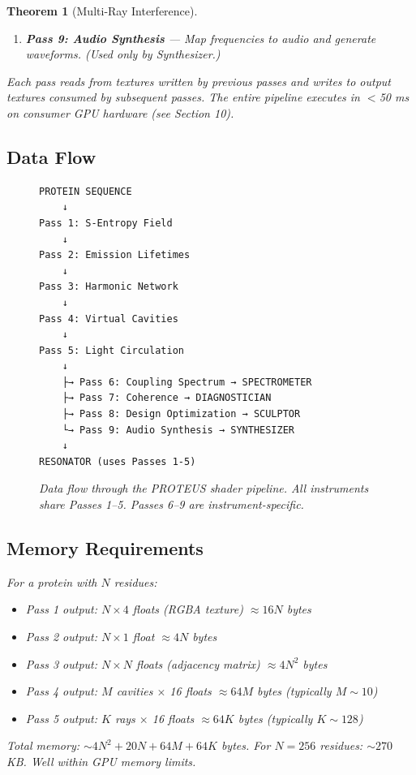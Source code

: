 \documentclass[11pt,a4paper]{article}
\newtheorem{theorem}{Theorem}[section]
\begin{document}
\begin{theorem}[Multi-Ray Interference]
\begin{enumerate}
\item \textbf{Pass 9: Audio Synthesis} — Map frequencies to audio and generate waveforms. (Used only by Synthesizer.)
\end{enumerate}

Each pass reads from textures written by previous passes and writes to output textures consumed by subsequent passes. The entire pipeline executes in $<$50 ms on consumer GPU hardware (see Section 10).

\subsection{Data Flow}

\begin{figure}[H]
\centering
\begin{verbatim}
PROTEIN SEQUENCE
    ↓
Pass 1: S-Entropy Field
    ↓
Pass 2: Emission Lifetimes
    ↓
Pass 3: Harmonic Network
    ↓
Pass 4: Virtual Cavities
    ↓
Pass 5: Light Circulation
    ↓
    ├→ Pass 6: Coupling Spectrum → SPECTROMETER
    ├→ Pass 7: Coherence → DIAGNOSTICIAN
    ├→ Pass 8: Design Optimization → SCULPTOR
    └→ Pass 9: Audio Synthesis → SYNTHESIZER
    ↓
RESONATOR (uses Passes 1-5)
\end{verbatim}
\caption{Data flow through the PROTEUS shader pipeline. All instruments share Passes 1--5. Passes 6--9 are instrument-specific.}
\end{figure}

\subsection{Memory Requirements}

For a protein with $N$ residues:
\begin{itemize}
\item Pass 1 output: $N \times 4$ floats (RGBA texture) $\approx 16N$ bytes
\item Pass 2 output: $N \times 1$ float $\approx 4N$ bytes
\item Pass 3 output: $N \times N$ floats (adjacency matrix) $\approx 4N^2$ bytes
\item Pass 4 output: $M$ cavities $\times$ 16 floats $\approx 64M$ bytes (typically $M \sim 10$)
\item Pass 5 output: $K$ rays $\times$ 16 floats $\approx 64K$ bytes (typically $K \sim 128$)
\end{itemize}

Total memory: $\sim 4N^2 + 20N + 64M + 64K$ bytes. For $N = 256$ residues: $\sim 270$ KB. Well within GPU memory limits.


\end{theorem}
\end{document}
